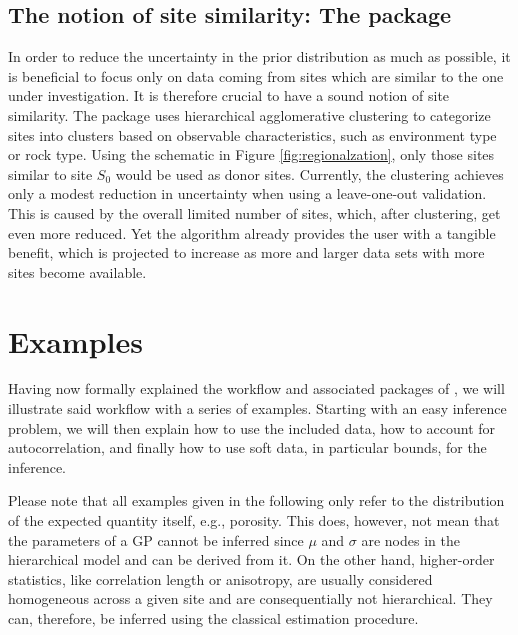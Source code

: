 \subsection{The notion of site similarity: The  package}

In order to reduce the uncertainty in the prior distribution as much as possible, it is beneficial to focus only on data coming from sites which are similar to the one under investigation.
It is therefore crucial to have a sound notion of site similarity.
The  package uses hierarchical agglomerative clustering to categorize sites into clusters based on observable characteristics, such as environment type or rock type. 
Using the schematic in Figure \ref{fig:regionalzation}, only those sites similar to site $S_0$ would be used as donor sites.
Currently, the clustering achieves only a modest reduction in uncertainty when using a leave-one-out validation.
This is caused by the overall limited number of sites, which, after clustering, get even more reduced.
Yet the algorithm already provides the user with a tangible benefit, which is projected to increase as more and larger data sets with more sites become available. 


\section{Examples}

Having now formally explained the workflow and associated packages of , we will illustrate said workflow with a series of examples. 
Starting with an easy inference problem, we will then explain how to use the included data, how to account for autocorrelation, and finally how to use soft data, in particular bounds, for the inference. 

Please note that all examples given in the following only refer to the distribution of the expected quantity itself, e.g., porosity. 
This does, however, not mean that the parameters of a GP cannot be inferred since $\mu$ and $\sigma$ are nodes in the hierarchical model and can be derived from it. On the other hand, higher-order statistics, like correlation length or anisotropy, are usually considered homogeneous across a given site and are consequentially not hierarchical. 
They can, therefore, be inferred using the classical estimation procedure.

